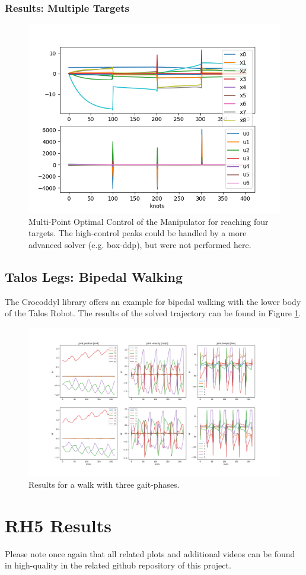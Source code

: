 \subsubsection{Results: Multiple Targets}
\begin{figure}[h!]
\centering
\includegraphics[width=.5\linewidth]{Media/Crocoddyl/ExArm/ArmSolution.png}
\caption{Multi-Point Optimal Control of the Manipulator for reaching four targets. The high-control peaks could be handled by a more advanced solver (e.g. box-ddp), but were not performed here.}
\end{figure}

\subsection{Talos Legs: Bipedal Walking}
The Crocoddyl library offers an example for bipedal walking with the lower body of the Talos \cite{stasse2017talos} Robot. The results of the solved trajectory can be found in Figure \ref{fig:TalosGait}. 

\begin{figure}[h!]
\centering
\includegraphics[width=.7\linewidth]{Media/Crocoddyl/ExBiped/TalosGait_Solution.png}
\caption{Results for a walk with three gait-phases.}
\label{fig:TalosGait}
\end{figure}

  



\section{RH5 Results}
Please note once again that all related plots and additional videos can be found in high-quality in the related github repository \cite{julesserOCFrameworks} of this project.
